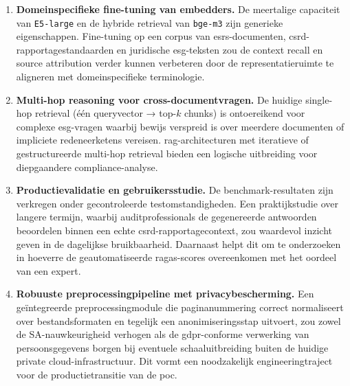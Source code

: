 \begin{enumerate}
  \item \textbf{Domeinspecifieke fine-tuning van embedders.} De meertalige capaciteit van \texttt{E5-large} en de hybride retrieval van \texttt{bge-m3} zijn generieke eigenschappen. Fine-tuning op een corpus van \gls{esrs}-documenten, \gls{csrd}-rapportagestandaarden en juridische \gls{esg}-teksten zou de context recall en source attribution verder kunnen verbeteren door de representatieruimte te aligneren met domeinspecifieke terminologie.
  \item \textbf{Multi-hop reasoning voor cross-documentvragen.} De huidige single-hop retrieval (één queryvector → top-$k$ chunks) is ontoereikend voor complexe \gls{esg}-vragen waarbij bewijs verspreid is over meerdere documenten of impliciete redeneerketens vereisen. \gls{rag}-architecturen met iteratieve of gestructureerde multi-hop retrieval bieden een logische uitbreiding voor diepgaandere compliance-analyse.
  \item \textbf{Productievalidatie en gebruikersstudie.} De benchmark-resultaten zijn verkregen onder gecontroleerde testomstandigheden. Een praktijkstudie over langere termijn, waarbij auditprofessionals de gegenereerde antwoorden beoordelen binnen een echte \gls{csrd}-rapportagecontext, zou waardevol inzicht geven in de dagelijkse bruikbaarheid. Daarnaast helpt dit om te onderzoeken in hoeverre de geautomatiseerde \gls{ragas}-scores overeenkomen met het oordeel van een expert.
  \item \textbf{Robuuste preprocessingpipeline met privacybescherming.} Een geïntegreerde preprocessingmodule die paginanummering correct normaliseert over bestandsformaten en tegelijk een anonimiseringsstap uitvoert, zou zowel de SA-nauwkeurigheid verhogen als de \gls{gdpr}-conforme verwerking van persoonsgegevens borgen bij eventuele schaaluitbreiding buiten de huidige private cloud-infrastructuur. Dit vormt een noodzakelijk engineeringtraject voor de productietransitie van de \gls{poc}.
\end{enumerate}
